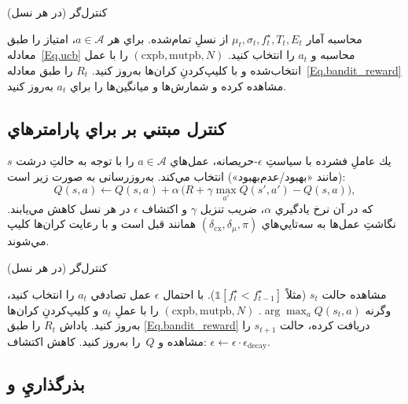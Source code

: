 \begin{algorithm}[H]
\caption{كنترل‌گر  (در هر نسل)}
\begin{algorithmic}[1]
\STATE محاسبه آمار \(\mu_t,\sigma_t,f^{\star}_t,T_t,E_t\) از نسلِ تمام‌شده.
\STATE براي هر \(a\in\mathcal{A}\)، امتياز  را طبق معادله~\eqref{Eq.ucb} محاسبه و \(a_t\) را انتخاب كنيد.
\STATE \((\text{cxpb},\text{mutpb},N)\) را با عمل انتخاب‌شده و با كليپ‌كردنِ كران‌ها به‌روز كنيد.
\STATE \(R_t\) را طبق معادله~\eqref{Eq.bandit_reward} مشاهده كرده و شمارش‌ها و ميانگين‌ها را براي \(a_t\) به‌روز كنيد.
\end{algorithmic}
\end{algorithm}

\subsection{كنترل مبتني بر  براي پارامترهاي }

يك عاملِ فشرده  با سياستِ \(\epsilon\)-حريصانه، عمل‌هاي \(a\in\mathcal{A}\) را با توجه به حالتِ درشت \(s\) (مانند «بهبود/عدم‌بهبود») انتخاب مي‌كند. به‌روزرسانی به صورت زير است:
\begin{equation}
    Q(s,a)\leftarrow Q(s,a)+\alpha\,\big(R+\gamma\max_{a'}Q(s',a')-Q(s,a)\big),
\end{equation}
كه در آن نرخ يادگيري \(\alpha\)، ضريب تنزيل \(\gamma\) و اكتشاف \(\epsilon\) در هر نسل كاهش مي‌يابند. نگاشتِ عمل‌ها به سه‌تايي‌هاي \((\delta_{\text{cx}},\delta_{\mu},\pi)\) همانند قبل است و با رعايت كران‌ها كليپ مي‌شوند.

\begin{algorithm}[H]
\caption{كنترل‌گر  (در هر نسل)}
\begin{algorithmic}[1]
\STATE مشاهده حالت \(s_t\) (مثلاً \(\mathbb{1}[f^{\star}_t<f^{\star}_{t-1}]\)).
\STATE با احتمال \(\epsilon\) عمل تصادفي \(a_t\) را انتخاب كنيد، وگرنه \(\arg\max_a Q(s_t,a)\).
\STATE \((\text{cxpb},\text{mutpb},N)\) را با عملِ \(a_t\) و كليپ‌كردنِ كران‌ها به‌روز كنيد.
\STATE پاداش \(R_t\) را طبق \eqref{Eq.bandit_reward} دريافت كرده، حالت \(s_{t+1}\) را مشاهده و \(\,Q\) را به‌روز كنيد.
\STATE كاهش اكتشاف: \(\epsilon\leftarrow\epsilon\cdot\epsilon_{\text{decay}}\).
\end{algorithmic}
\end{algorithm}

\subsection{بذرگذاريِ  و }

